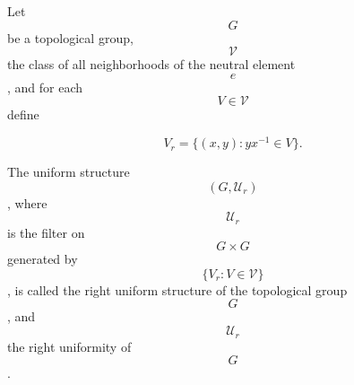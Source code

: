 Let $$G$$ be a topological group, $$\mathcal{V}$$ the class of all neighborhoods of the neutral element $$e$$, and for each $$V \in \mathcal{V}$$ define

$$V_r = \{(x, y) : yx^{-1} \in V\}.$$

The uniform structure $$(G, \mathcal{U}_r)$$, where $$\mathcal{U}_r$$ is the filter on $$G \times G$$ generated by $$\{V_r : V \in \mathcal{V}\}$$, is called the right uniform structure of the topological group $$G$$, and $$\mathcal{U}_r$$ the right uniformity of $$G$$.
